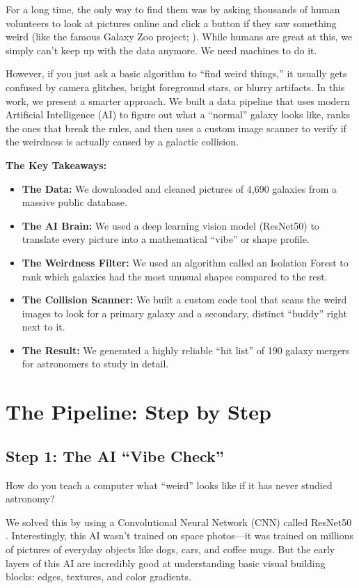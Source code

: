\documentclass[twocolumn]{aastex631}
\begin{document}
For a long time, the only way to find them was by asking thousands of human volunteers to look at pictures online and click a button if they saw something weird (like the famous Galaxy Zoo project; \citealp{lintott2008}). While humans are great at this, we simply can't keep up with the data anymore. We need machines to do it.

However, if you just ask a basic algorithm to ``find weird things,'' it usually gets confused by camera glitches, bright foreground stars, or blurry artifacts. In this work, we present a smarter approach. We built a data pipeline that uses modern Artificial Intelligence (AI) to figure out what a ``normal'' galaxy looks like, ranks the ones that break the rules, and then uses a custom image scanner to verify if the weirdness is actually caused by a galactic collision.

\textbf{The Key Takeaways:}
\begin{itemize}
    \item \textbf{The Data:} We downloaded and cleaned pictures of 4,690 galaxies from a massive public database.
    \item \textbf{The AI Brain:} We used a deep learning vision model (ResNet50) to translate every picture into a mathematical ``vibe'' or shape profile.
    \item \textbf{The Weirdness Filter:} We used an algorithm called an Isolation Forest to rank which galaxies had the most unusual shapes compared to the rest.
    \item \textbf{The Collision Scanner:} We built a custom code tool that scans the weird images to look for a primary galaxy and a secondary, distinct ``buddy'' right next to it.
    \item \textbf{The Result:} We generated a highly reliable ``hit list'' of 190 galaxy mergers for astronomers to study in detail.
\end{itemize}

\section{The Pipeline: Step by Step} \label{sec:methods}

\subsection{Step 1: The AI ``Vibe Check''}
How do you teach a computer what ``weird'' looks like if it has never studied astronomy? 

We solved this by using a Convolutional Neural Network (CNN) called ResNet50 \citep{he2016}. Interestingly, this AI wasn't trained on space photos—it was trained on millions of pictures of everyday objects like dogs, cars, and coffee mugs. But the early layers of this AI are incredibly good at understanding basic visual building blocks: edges, textures, and color gradients. 
\end{document}
